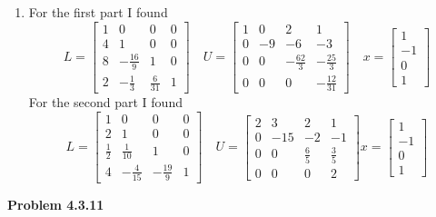 \documentclass{article}
\newcommand{\Problem}[1]{\textbf{Problem #1}}
\begin{document}
\begin{enumerate}
\item For the first part I found
\begin{equation*}
L = 
\begin{bmatrix}
1 & 0 & 0 & 0\\
4  & 1 & 0 & 0\\
8 & -\frac{16}{9} & 1 & 0\\
2 & -\frac{1}{3} & \frac{6}{31} & 1	
\end{bmatrix}
\quad
U = 
\begin{bmatrix}
1 & 0 & 2 & 1\\
0 & -9 & -6 & -3\\
0 & 0 &-\frac{62}{3} & -\frac{25}{3}\\
0 & 0 & 0 & -\frac{12}{31}	
\end{bmatrix}
\quad
x = 
\begin{bmatrix}
1\\
-1\\
0\\
1	
\end{bmatrix}
\end{equation*}
For the second part I found
\begin{equation*}
L = 
\begin{bmatrix}
1 & 0 & 0 & 0\\
2 & 1 & 0 & 0\\
\frac{1}{2} & \frac{1}{10} & 1 & 0\\
4 & -\frac{4}{15} & -\frac{19}{9} & 1 	
\end{bmatrix}
\quad
U = 
\begin{bmatrix}
2 & 3 & 2 & 1\\
0 & -15 & -2 & -1\\
0 & 0 & \frac{6}{5} & \frac{3}{5}\\
0 & 0 & 0 & 2	
\end{bmatrix}
x = 
\begin{bmatrix}
1\\
-1\\
0\\
1	
\end{bmatrix}
\end{equation*}


\end{enumerate}

\Problem{4.3.11}
\end{document}
